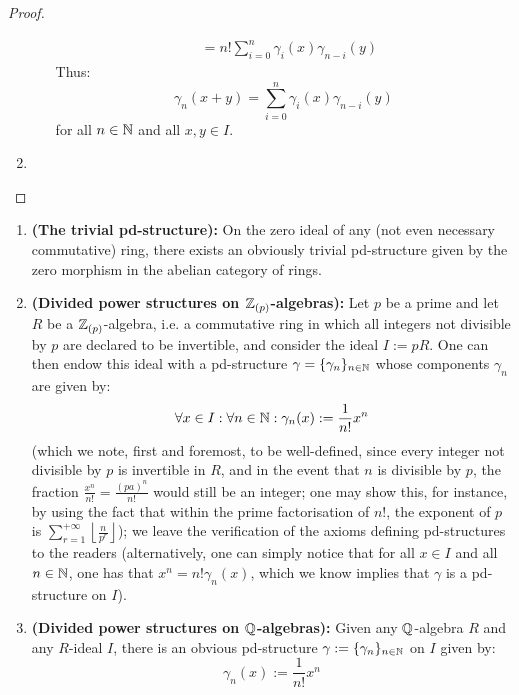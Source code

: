 \begin{proof}
\begin{enumerate}
\begin{enumerate}
$$\begin{aligned}
                                                & = n!\sum_{i=0}^n \gamma_i(x)\gamma_{n - i}(y)
                                            \end{aligned}
                                        $$
                                    Thus:
                                        $$\gamma_n(x + y) = \sum_{i=0}^n \gamma_i(x)\gamma_{n - i}(y)$$
                                    for all $n \in \mathbb{N}$ and all $x, y \in I$. 
                                \end{enumerate}
                            \item 
                        \end{enumerate}
                    \end{proof}
                    
                \begin{example}
                    \noindent
                    \begin{enumerate}
                        \item \textbf{(The trivial pd-structure):} On the zero ideal of any (not even necessary commutative) ring, there exists an obviously trivial pd-structure given by the zero morphism in the abelian category of rings. 
                        \item \textbf{(Divided power structures on $\mathbb{Z}_{(p)}$-algebras):} Let $p$ be a prime and let $R$ be a $\mathbb{Z}_{(p)}$-algebra, i.e. a commutative ring in which all integers not divisible by $p$ are declared to be invertible, and consider the ideal $I := pR$. One can then endow this ideal with a pd-structure $\gamma = \{\gamma_n\}_{n \in \mathbb{N}}$ whose components $\gamma_n$ are given by:
                            $$\forall x \in I: \forall n \in \mathbb{N}: \gamma_n(x) := \frac{1}{n!}x^n$$
                        (which we note, first and foremost, to be well-defined, since every integer not divisible by $p$ is invertible in $R$, and in the event that $n$ is divisible by $p$, the fraction $\frac{x^n}{n!} = \frac{(pa)^n}{n!}$ would still be an integer; one may show this, for instance, by using the fact that within the prime factorisation of $n!$, the exponent of $p$ is $\sum_{r=1}^{+\infty} \left\lfloor \frac{n}{p^r} \right\rfloor$); we leave the verification of the axioms defining pd-structures to the readers (alternatively, one can simply notice that for all $x \in I$ and all $n \in \mathbb{N}$, one has that $x^n = n!\gamma_n(x)$, which we know implies that $\gamma$ is a pd-structure on $I$).
                        \item \textbf{(Divided power structures on $\mathbb{Q}$-algebras):} Given any $\mathbb{Q}$-algebra $R$ and any $R$-ideal $I$, there is an obvious pd-structure $\gamma := \{\gamma_n\}_{n \in \mathbb{N}}$ on $I$ given by:
                            $$\gamma_n(x) := \frac{1}{n!} x^n$$
                    \end{enumerate}
                \end{example}
                
